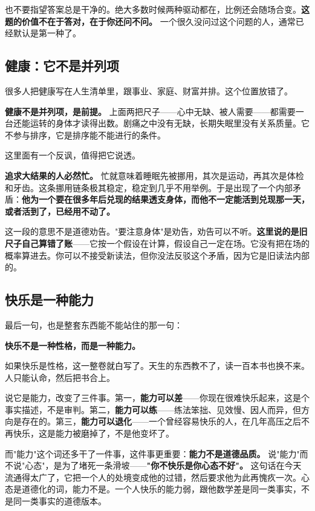 \documentclass[11pt,a4paper]{ctexart}
\begin{document}
也不要指望答案总是干净的。绝大多数时候两种驱动都在，比例还会随场合变。\textbf{这题的价值不在于答对，在于你还问不问。} 一个很久没问过这个问题的人，通常已经默认是第一种了。

\subsection{健康：它不是并列项}

很多人把健康写在人生清单里，跟事业、家庭、财富并排。这个位置放错了。

\textbf{健康不是并列项，是前提。} 上面两把尺子——心中无缺、被人需要——都需要一台还能运转的身体才读得出数。剧痛之中没有无缺，长期失眠里没有关系质量。它不参与排序，它是排序能不能进行的条件。

这里面有一个反讽，值得把它说透。

\textbf{追求大结果的人必然忙。} 忙就意味着睡眠先被挪用，其次是运动，再其次是体检和牙齿。这条挪用链条极其稳定，稳定到几乎不用举例。于是出现了一个内部矛盾：\textbf{他为一个要在很多年后兑现的结果透支身体，而他不一定能活到兑现那一天，或者活到了，已经用不动了。}

这一段的意思不是道德劝告。"要注意身体"是劝告，劝告可以不听。\textbf{这里说的是旧尺子自己算错了账}——它按一个假设在计算，假设自己一定在场。它没有把在场的概率算进去。你可以不接受新读法，但你没法反驳这个矛盾，因为它是旧读法内部的。

\subsection{快乐是一种能力}

最后一句，也是整套东西能不能站住的那一句：

\textbf{快乐不是一种性格，而是一种能力。}

如果快乐是性格，这一整卷就白写了。天生的东西教不了，读一百本书也换不来。人只能认命，然后把书合上。

说它是能力，改变了三件事。第一，\textbf{能力可以差}——你现在很难快乐起来，这是个事实描述，不是审判。第二，\textbf{能力可以练}——练法笨拙、见效慢、因人而异，但方向是存在的。第三，\textbf{能力可以退化}——一个曾经容易快乐的人，在几年高压之后不再快乐，这是能力被磨掉了，不是他变坏了。

而"能力"这个词还多干了一件事，这件事更重要：\textbf{能力不是道德品质。} 说"能力"而不说"心态"，是为了堵死一条滑坡——\textbf{"你不快乐是你心态不好"。} 这句话在今天流通得太广了，它把一个人的处境变成他的过错，然后要求他为此再愧疚一次。心态是道德化的词，能力不是。一个人快乐的能力弱，跟他数学差是同一类事实，不是同一类事实的道德版本。
\end{document}
